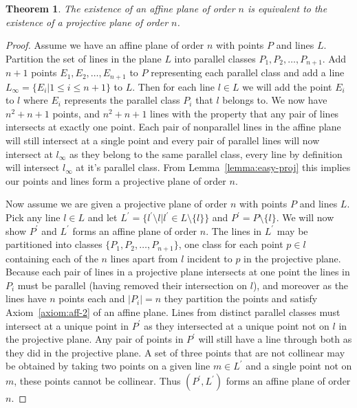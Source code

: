 \documentclass{article}
\newtheorem{theorem}{Theorem}
\begin{document}
\begin{theorem}
  The existence of an affine plane of order \(n\) is equivalent to the existence of a projective plane of order \(n\).
\end{theorem}
\begin{proof}
  Assume we have an affine plane of order \(n\) with points \(P\) and lines
\(L\). Partition the set of lines in the plane \(L\) into parallel classes
\(P_{1}, P_{2}, \ldots, P_{n + 1}\). Add \(n + 1\) points
\(E_{1}, E_{2}, \ldots, E_{n + 1}\) to \(P\) representing each parallel class and add
a line \(L_{\infty} = \{E_{i} | 1 \le i \le n + 1\}\) to \(L\). Then for each line
\(l \in L\) we will add the point \(E_{i}\) to \(l\) where \(E_{i}\) represents
the parallel class \(P_{i}\) that \(l\) belongs to. We now have
\(n^{2} + n + 1\) points, and \(n^{2} + n + 1\) lines with the property that any
pair of lines intersects at exactly one point. Each pair of nonparallel lines in the
affine plane will still intersect at a single point and every pair of parallel lines will
now intersect at \(l_{\infty}\) as they belong to the same parallel class, every line by definition will intersect \(l_{\infty}\) at it's parallel class. From
Lemma~\ref{lemma:easy-proj} this implies our points and lines form a projective
plane of order \(n\).

  Now assume we are given a projective plane of order \(n\) with points \(P\)
and lines \(L\). Pick any line \(l \in L\) and let
\(L^{\prime} = \{l^{\prime} \setminus l | l^{\prime} \in L \setminus \{l\}\}\) and \(P^{\prime} = P \setminus \{l\}\). We will now
show \(P^{\prime}\) and \(L^{\prime}\) forms an affine plane of order \(n\). The lines in
\(L^{\prime}\) may be partitioned into classes \(\{P_{1}, P_{2}, \ldots, P_{n + 1}\}\),
one class for each point \(p \in l\) containing each of the \(n\) lines apart from
\(l\) incident to \(p\) in the projective plane. Because each pair of lines in a
projective plane intersects at one point the lines in \(P_{i}\) must be parallel
(having removed their intersection on \(l\)), and moreover as the lines have
\(n\) points each and \(|P_{i}| = n\) they partition the points and satisfy
Axiom~\ref{axiom:aff-2} of an affine plane. Lines from distinct parallel classes
must intersect at a unique point in \(P^{\prime}\) as they intersected at a unique
point not on \(l\) in the projective plane. Any pair of points in \(P^{\prime}\) will
still have a line through both as they did in the projective plane. A set of
three points that are not collinear may be obtained by taking two points on a
given line \(m \in L^{\prime}\) and a single point not on \(m\), these points cannot be
collinear. Thus \((P^{\prime}, L^{\prime})\) forms an affine plane of order \(n\).
\end{proof}
\end{document}
